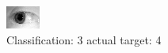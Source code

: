 \begin{figure}[h!]
\begin{center}
\includegraphics[width=0.60\columnwidth]{figures/ID1225_class_3_target_4.png}
\end{center}
\caption{ Classification: 3 actual target: 4}
\label{fig:ID1225_class_3_target_4}
\end{figure}
